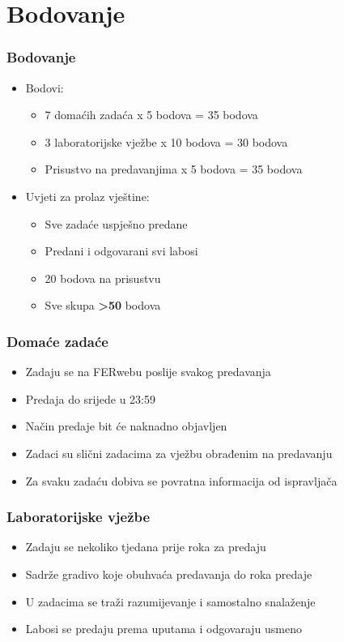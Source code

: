 \documentclass{beamer}
\begin{document}
\section{Bodovanje}
\begin{frame}[t]
\frametitle{Bodovanje}
\begin{itemize}
	\item Bodovi:
	\begin{itemize}
		\item 7 domaćih zadaća x 5 bodova = 35 bodova
		\item 3 laboratorijske vježbe x 10 bodova = 30 bodova
		\item Prisustvo na predavanjima x 5 bodova = 35 bodova
	\end{itemize}
	\item Uvjeti za prolaz vještine:
	\begin{itemize}
		\item Sve zadaće uspješno predane
		\item Predani i odgovarani svi labosi
		\item 20 bodova na prisustvu
		\item Sve skupa \textbf{\textgreater 50} bodova
	\end{itemize}
\end{itemize}
\end{frame}

\begin{frame}[t]
\frametitle{Domaće zadaće}
\begin{itemize}
	\item Zadaju se na FERwebu poslije svakog predavanja
	\item Predaja do srijede u 23:59
	\item Način predaje bit će naknadno objavljen
	\item Zadaci su slični zadacima za vježbu obrađenim na predavanju
	\item Za svaku zadaću dobiva se povratna informacija od ispravljača
\end{itemize}
\end{frame}

\begin{frame}[t]
\frametitle{Laboratorijske vježbe}
\begin{itemize}
	\item Zadaju se nekoliko tjedana prije roka za predaju
	\item Sadrže gradivo koje obuhvaća predavanja do roka predaje
	\item U zadacima se traži razumijevanje i samostalno snalaženje
	\item Labosi se predaju prema uputama i odgovaraju usmeno
\end{itemize}
\end{frame}
\end{document}
